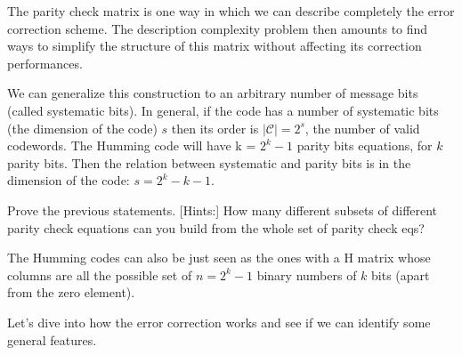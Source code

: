The parity check matrix is one way in which we can describe completely the error correction scheme. The description complexity problem then amounts to find ways to simplify the structure of this matrix without affecting its correction performances.


We can generalize this construction to an arbitrary number of message bits (called systematic bits). In general, if the code has a number of systematic bits (the dimension of the code) $s$ then its order is $|\mathcal{C}| = 2^{s}$, the number of valid codewords. The Humming code will have k = $ 2^k -1 $ parity bits equations, for $k$ parity bits. Then the relation between systematic and parity bits is in the dimension of the code: $s = 2^{k} - k - 1$.

\begin{example}
	Prove the previous statements.
	[Hints:] How many different subsets of different parity check equations can you build from the whole set of parity check eqs?
\end{example}

The Humming codes can also be just seen as the ones with a H matrix whose columns are all the possible set of $n = 2^k-1$ binary numbers of $k$ bits (apart from the zero element).


Let's dive into how the error correction works and see if we can identify some general features.

